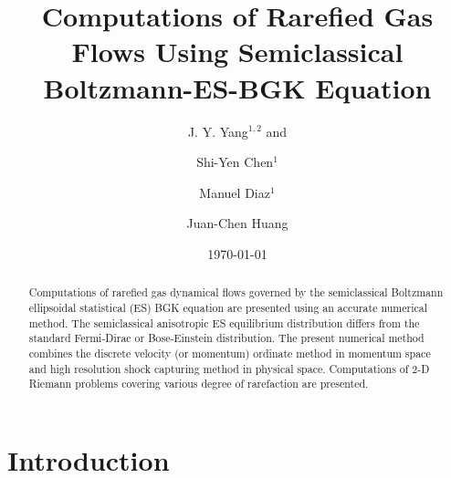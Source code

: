 \documentclass[twocolumn,prX]{revtex4} %
\begin{document}
\title{Computations of Rarefied Gas Flows Using Semiclassical Boltzmann-ES-BGK Equation}
\author{J. Y. Yang$^{1,2}$ and} %
\author{ Shi-Yen Chen$^{1}$} %
\author{ Manuel Diaz$^{1}$}
\author{Juan-Chen Huang}
\date{\today}

\begin{abstract}
Computations of rarefied gas dynamical flows governed by the semiclassical Boltzmann ellipsoidal statistical (ES) BGK equation are presented using an accurate numerical method.  The semiclassical anisotropic ES equilibrium distribution differs from the standard Fermi-Dirac or Bose-Einstein distribution.  The present numerical method combines the discrete velocity (or momentum) ordinate method in momentum space and high resolution shock capturing method in physical space.  Computations of 2-D Riemann problems covering various degree of rarefaction are presented.  
\end{abstract}

\address{$^{1}$Institute of Applied Mechanics, National Taiwan
University, Taipei 106, TAIWAN}
\address{$^{2}$Center of Advanced Study in Theoretical Science, National Taiwan
University, Taipei 106, TAIWAN}
\address{$^{1}$Department of Merchant Marine, National Taiwan Ocean University, Keelung, TAIWAN}

\maketitle

\section{Introduction}

\label{sec:1}   
\end{document}

